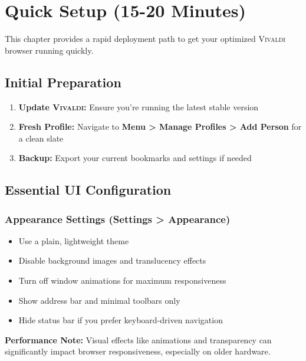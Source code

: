 \documentclass[11pt,a4paper,oneside]{book}
\newcommand{\vivaldi}{\textsc{Vivaldi}}
\newcommand{\menupath}[1]{\textbf{\color{darkgray}#1}}
\begin{document}
\chapter{Quick Setup (15-20 Minutes)}

This chapter provides a rapid deployment path to get your optimized \vivaldi{} browser running quickly.

\section{Initial Preparation}

\begin{enumerate}
    \item \textbf{Update \vivaldi{}:} Ensure you're running the latest stable version
    \item \textbf{Fresh Profile:} Navigate to \menupath{Menu > Manage Profiles > Add Person} for a clean slate
    \item \textbf{Backup:} Export your current bookmarks and settings if needed
\end{enumerate}

\section{Essential UI Configuration}

\subsection{Appearance Settings (\menupath{Settings > Appearance})}

\begin{itemize}
    \item Use a plain, lightweight theme
    \item Disable background images and translucency effects
    \item Turn off window animations for maximum responsiveness
    \item Show address bar and minimal toolbars only
    \item Hide status bar if you prefer keyboard-driven navigation
\end{itemize}

\begin{warningbox}
\textbf{Performance Note:} Visual effects like animations and transparency can significantly impact browser responsiveness, especially on older hardware.
\end{warningbox}
\end{document}
